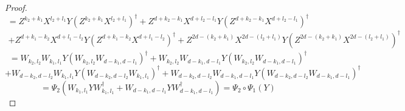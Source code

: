 \documentclass[12pt]{amsart}
\numberwithin{equation}{section}
\begin{document}
\begin{proof}
    \[=Z^{k_2+k_1} X^{l_2+l_1} Y \left(Z^{k_2+k_1} X^{l_2+l_1} \right)^{\dagger}+Z^{d+k_2-k_1} X^{d+l_2-l_1} Y \left(Z^{d+k_2-k_1} X^{d+l_2-l_1}\right)^{\dagger}\]
    \begin{eqnarray*}
        +Z^{d+k_1-k_2} X^{d+l_1-l_2} Y \left(Z^{d+k_1-k_2} X^{d+l_1-l_2} \right)^{\dagger}+Z^{2d-(k_2+k_1)} X^{2d-(l_2+l_1)} Y \left(Z^{2d-(k_2+k_1)} X^{2d-(l_2+l_1)} \right)^{\dagger}
    \end{eqnarray*}
\[=W_{k_2,l_2} W_{k_1,l_1} Y \left( W_{k_2,l_2} W_{d-k_1,d-l_1}\right)^{\dagger} + W_{k_2,l_2} W_{d-k_1,d-l_1} Y \left( W_{k_2,l_2} W_{d-k_1,d-l_1}\right)^{\dagger}\]
\[+W_{d-k_2,d-l_2} W_{k_1,l_1} Y \left( W_{d-k_2,d-l_2} W_{k_1,l_1}\right)^{\dagger}+W_{d-k_2,d-l_2} W_{d-k_1,d-l_1} Y \left( W_{d-k_2,d-l_2} W_{d-k_1,d-l_1}\right)^{\dagger}\]
\[=\Psi_2 \left( W_{k_1,l_1} Y W^{\dagger}_{k_1, l_1} + W_{d-k_1,d-l_1} Y W^{\dagger}_{d-k_1,d-l_1} \right) = \Psi_2 \circ \Psi_1 (Y)\]
    
\end{proof}


\fi
\end{document}
